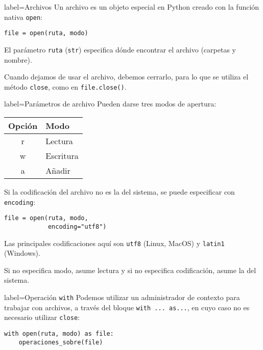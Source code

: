 
\begin{contentbox}{label=Archivos}
    Un archivo es un objeto especial en Python creado con la función nativa \lstinline!open!:
    
    \begin{center}
        \lstinline!file = open(ruta, modo)!
    \end{center}
    
    El parámetro \texttt{ruta} (\lstinline!str!) especifica dónde encontrar el archivo (carpetas y nombre).
    
    Cuando dejamos de usar el archivo, debemos cerrarlo, para lo que se utiliza el método \lstinline!close!, como en \lstinline!file.close()!.
\end{contentbox}
    
\begin{contentbox}{label=Parámetros de archivo}
    Pueden darse tres modos de apertura:
    
    \begin{center}
        \begin{tabular}{C|p{0.5\textwidth}}
            \textnormal{Opción} & Modo \\
            \hline
            r & Lectura \\
            w & Escritura \\
            a & Añadir
        \end{tabular}
    \end{center}
    
    Si la codificación del archivo no es la del sistema, se puede especificar con \lstinline!encoding!:
    \begin{lstlisting}
file = open(ruta, modo,
            encoding="utf8")
    \end{lstlisting}
    
    Las principales codificaciones aquí son \lstinline!utf8! (Linux, MacOS) y \lstinline!latin1! (Windows).

    Si no especifica modo, asume lectura y si no especifica codificación, asume la del sistema.
\end{contentbox}
    
\begin{contentbox}{label=Operación \lstinline!with!}
    Podemos utilizar un administrador de contexto para trabajar con archivos, a través del bloque \lstinline!with ... as...!, en cuyo caso no es necesario utilizar \lstinline!close!:
    \begin{lstlisting}
with open(ruta, modo) as file:
    operaciones_sobre(file)
    \end{lstlisting}
\end{contentbox}

